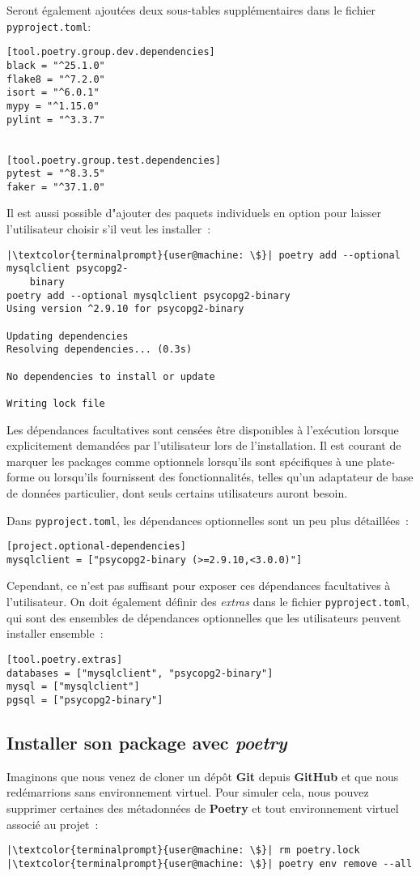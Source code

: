Seront également ajoutées deux sous-tables supplémentaires dans le fichier \texttt{pyproject.toml}:
\begin{verbatim}
[tool.poetry.group.dev.dependencies]
black = "^25.1.0"
flake8 = "^7.2.0"
isort = "^6.0.1"
mypy = "^1.15.0"
pylint = "^3.3.7"


[tool.poetry.group.test.dependencies]
pytest = "^8.3.5"
faker = "^37.1.0"
\end{verbatim}

Il est aussi possible d"ajouter des paquets individuels en option pour laisser l’utilisateur choisir s’il veut les installer :
\begin{lstlisting}[style=terminal]
|\textcolor{terminalprompt}{user@machine: \$}| poetry add --optional mysqlclient psycopg2-
    binary
poetry add --optional mysqlclient psycopg2-binary
Using version ^2.9.10 for psycopg2-binary

Updating dependencies
Resolving dependencies... (0.3s)

No dependencies to install or update

Writing lock file
\end{lstlisting}

Les dépendances facultatives sont censées être disponibles à l’exécution lorsque explicitement demandées par l’utilisateur lors de l’installation. Il est courant de marquer les packages comme optionnels lorsqu’ils sont spécifiques à une plate-forme ou lorsqu’ils fournissent des fonctionnalités, telles qu’un adaptateur de base de données particulier, dont seuls certains utilisateurs auront besoin.

Dans \texttt{pyproject.toml}, les dépendances optionnelles sont un peu plus détaillées :
\begin{verbatim}
[project.optional-dependencies]
mysqlclient = ["psycopg2-binary (>=2.9.10,<3.0.0)"]
\end{verbatim}

Cependant, ce n’est pas suffisant pour exposer ces dépendances facultatives à l’utilisateur. On doit également définir des \textit{extras} dans le fichier \texttt{pyproject.toml}, qui sont des ensembles de dépendances optionnelles que les utilisateurs peuvent installer ensemble :
\begin{verbatim}
[tool.poetry.extras]
databases = ["mysqlclient", "psycopg2-binary"]
mysql = ["mysqlclient"]
pgsql = ["psycopg2-binary"]
\end{verbatim}

\subsection*{Installer son package avec \textit{poetry}}
Imaginons que nous venez de cloner un dépôt \textbf{Git} depuis \textbf{GitHub} et que nous redémarrions sans environnement virtuel. Pour simuler cela, nous pouvez supprimer certaines des métadonnées de \textbf{Poetry} et tout environnement virtuel associé au projet :
\begin{lstlisting}[style=terminal]
|\textcolor{terminalprompt}{user@machine: \$}| rm poetry.lock
|\textcolor{terminalprompt}{user@machine: \$}| poetry env remove --all
\end{lstlisting}

